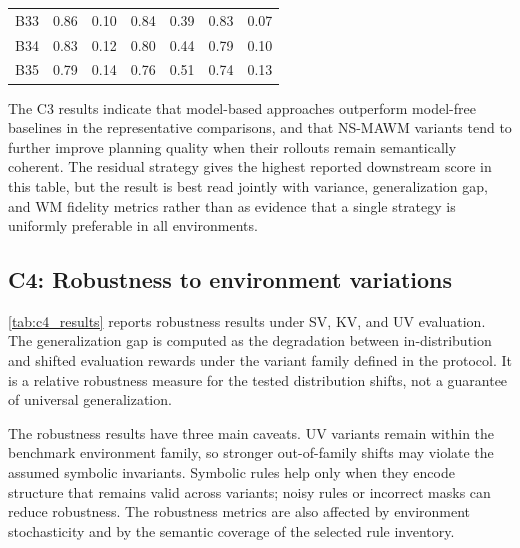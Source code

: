 \documentclass{article}
\theoremstyle{plain}
\theoremstyle{definition}
\theoremstyle{remark}
\begin{document}
\begin{table}[h!]
{\begin{tabular}{lcccccc}
      B33                             &
      0.86                            &
      0.10                            &
      0.84                            &
      0.39                            &
      0.83                            &
      0.07                              \\

      B34                             &
      0.83                            &
      0.12                            &
      0.80                            &
      0.44                            &
      0.79                            &
      0.10                              \\

      B35                             &
      0.79                            &
      0.14                            &
      0.76                            &
      0.51                            &
      0.74                            &
      0.13                              \\

      \bottomrule
    \end{tabular}
  }
\end{table}

The C3 results indicate that model-based approaches outperform model-free baselines in the representative comparisons, and that NS-MAWM variants tend to further improve planning quality when their rollouts remain semantically coherent. The residual strategy gives the highest reported downstream score in this table, but the result is best read jointly with variance, generalization gap, and WM fidelity metrics rather than as evidence that a single strategy is uniformly preferable in all environments.

\subsection{C4: Robustness to environment variations}

\autoref{tab:c4_results} reports robustness results under SV, KV, and UV evaluation. The generalization gap is computed as the degradation between in-distribution and shifted evaluation rewards under the variant family defined in the protocol. It is a relative robustness measure for the tested distribution shifts, not a guarantee of universal generalization.

The robustness results have three main caveats. UV variants remain within the benchmark environment family, so stronger out-of-family shifts may violate the assumed symbolic invariants. Symbolic rules help only when they encode structure that remains valid across variants; noisy rules or incorrect masks can reduce robustness. The robustness metrics are also affected by environment stochasticity and by the semantic coverage of the selected rule inventory.
\end{document}
